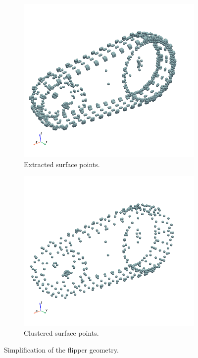 \documentclass[a4paper,12pt]{article}
\begin{document}
\begin{figure}[H]
  \begin{subfigure}[t]{0.45\textwidth}
      \centering
      \includegraphics[width=\textwidth]{fig/flipper_surface_points.png} %
      \caption{Extracted surface points.}
      \label{fig:fig3}
  \end{subfigure}
  \hfill
  \begin{subfigure}[t]{0.45\textwidth}
      \centering
      \includegraphics[width=\textwidth]{fig/flipper_clustered.png} %
      \caption{Clustered surface points.}
      \label{fig:fig4}
  \end{subfigure}

  \caption{Simplification of the flipper geometry.}
  \label{fig:4figures}
\end{figure}
\end{document}
